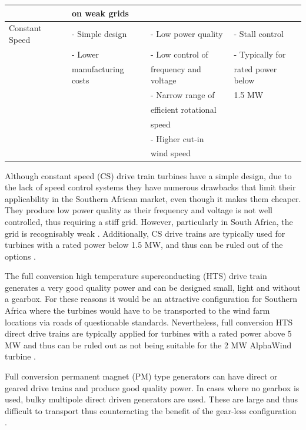 \begin{table}[H]
\begin{tabular}{ |l|l|l|l| }
  & on weak grids & & \\
  \hline
  Constant Speed & - Simple design & - Low power quality & - Stall control \\
   & - Lower & - Low control of & - Typically for  \\
   & manufacturing costs & frequency and voltage & rated power below \\
   & & - Narrow range of & 1.5 MW \\
   & & efficient rotational & \\
   & & speed & \\
   & & - Higher cut-in & \\
   & & wind speed & \\
  \hline
 \end{tabular}
\end{table}

\newpage
Although constant speed (CS) drive train turbines have a simple design, due to the lack of speed control systems they have numerous drawbacks that limit their applicability in the Southern African market, even though it makes them cheaper. They produce low power quality as their frequency and voltage is not well controlled, thus requiring a stiff grid. However, particularly in South Africa, the grid is recognisably weak \cite{onishi}. Additionally, CS drive trains are typically used for turbines with a rated power below 1.5 MW, and thus can be ruled out of the options  \cite{mcgahan}.

The full conversion high temperature superconducting (HTS) drive train generates a very good quality power and can be designed small, light and without a gearbox. For these reasons it would be an attractive configuration for Southern Africa where the turbines would have to be transported to the wind farm locations via roads of questionable standards. Nevertheless, full conversion HTS direct drive trains are typically applied for turbines with a rated power above 5 MW and thus can be ruled out as not being suitable for the 2 MW AlphaWind turbine \cite{mcgahan}.

Full conversion permanent magnet (PM) type generators can have direct or geared drive trains and produce good quality power. In cases where no gearbox is used, bulky multipole direct driven generators are used. These are large and thus difficult to transport thus counteracting the benefit of the gear-less configuration \cite{hansen}.


